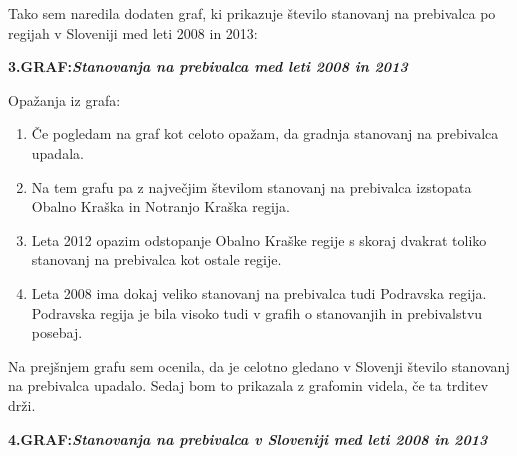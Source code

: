 \documentclass[11pt,a4paper]{article}
\begin{document}
\newpage
Tako sem naredila dodaten graf, ki prikazuje število stanovanj na prebivalca po regijah v Sloveniji med leti 2008 in 2013:

\textbf{3.GRAF:\emph{Stanovanja na prebivalca med leti 2008 in 2013}}

\makebox[\textwidth][c]{

}

Opažanja iz grafa:
\begin{enumerate}
\item{Če pogledam na graf kot celoto opažam, da gradnja stanovanj na prebivalca upadala.}
\item{Na tem grafu pa z največjim številom stanovanj na prebivalca izstopata Obalno Kraška in Notranjo Kraška regija.}
\item{Leta 2012 opazim odstopanje Obalno Kraške regije s skoraj dvakrat toliko stanovanj na prebivalca kot ostale regije.}
\item{Leta 2008 ima dokaj veliko stanovanj na prebivalca tudi Podravska regija. Podravska regija je bila visoko tudi v grafih o stanovanjih in prebivalstvu posebaj.}
\end{enumerate}

\newpage
Na prejšnjem grafu sem ocenila, da je celotno gledano v Slovenji število stanovanj na prebivalca upadalo. Sedaj bom to prikazala z grafomin videla, če ta trditev drži.

\textbf{4.GRAF:\emph{Stanovanja na prebivalca v Sloveniji med leti 2008 in 2013}}

\makebox[\textwidth][c]{

}
\end{document}
